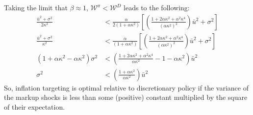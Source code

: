 \documentclass[11pt]{article} %
\begin{document}
Taking the limit that $\beta \approx 1$, $\mathcal{W}^{\pi} < \mathcal{W}^{D} $ leads to the following:
\begin{align*}
\frac{\bar{u}^2 + \sigma^2}{2\kappa^2}&< \frac{\alpha}{2(1+\alpha\kappa^2)} \left[\left(   \frac{1 + 2\alpha\kappa^2 + \alpha^2\kappa^4 }{(\alpha\kappa^2 )^2} \right)\bar{u}^2 + \sigma^2 \right]\\
\frac{\bar{u}^2 + \sigma^2}{\kappa^2}&< \frac{\alpha}{(1+\alpha\kappa^2)} \left[\left(   \frac{1 + 2\alpha\kappa^2 + \alpha^2\kappa^4 }{(\alpha\kappa^2 )^2} \right)\bar{u}^2 + \sigma^2 \right] \\
\left(1+\alpha\kappa^2 - \alpha\kappa^2  \right)\sigma^2 &< \left( \frac{1 + 2\alpha\kappa^2 + \alpha^2\kappa^4 }{\alpha\kappa^2 }  - 1-\alpha\kappa^2\right)\bar{u}^2 \\
\sigma^2 &< \left( \frac{1 + \alpha\kappa^2 }{\alpha\kappa^2 } \right)\bar{u}^2
\end{align*}
So, inflation targeting is optimal relative to discretionary policy if the variance of the markup shocks is less than some (positive) constant multiplied by the square of their expectation.
\end{document}
